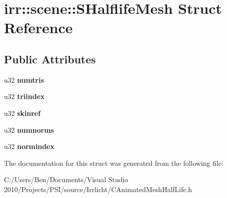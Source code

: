 \hypertarget{structirr_1_1scene_1_1_s_halflife_mesh}{\section{irr\-:\-:scene\-:\-:S\-Halflife\-Mesh Struct Reference}
\label{structirr_1_1scene_1_1_s_halflife_mesh}
}
\subsection*{Public Attributes}
\begin{DoxyCompactItemize}
\item 
\hypertarget{structirr_1_1scene_1_1_s_halflife_mesh_a77867441a6f7d9fdb33e2d89a884f502}{u32 {\bfseries numtris}}\label{structirr_1_1scene_1_1_s_halflife_mesh_a77867441a6f7d9fdb33e2d89a884f502}

\item 
\hypertarget{structirr_1_1scene_1_1_s_halflife_mesh_ae626e232e9d1d8ef21c98ea98a2300cb}{u32 {\bfseries triindex}}\label{structirr_1_1scene_1_1_s_halflife_mesh_ae626e232e9d1d8ef21c98ea98a2300cb}

\item 
\hypertarget{structirr_1_1scene_1_1_s_halflife_mesh_a2f12e23f6a640b9f26ca575eb969d16e}{u32 {\bfseries skinref}}\label{structirr_1_1scene_1_1_s_halflife_mesh_a2f12e23f6a640b9f26ca575eb969d16e}

\item 
\hypertarget{structirr_1_1scene_1_1_s_halflife_mesh_a8ac98deed1e5a5ebcdc87e05df5a6b4b}{u32 {\bfseries numnorms}}\label{structirr_1_1scene_1_1_s_halflife_mesh_a8ac98deed1e5a5ebcdc87e05df5a6b4b}

\item 
\hypertarget{structirr_1_1scene_1_1_s_halflife_mesh_a62bb383e98663028c3cc23fc3b2cba82}{u32 {\bfseries normindex}}\label{structirr_1_1scene_1_1_s_halflife_mesh_a62bb383e98663028c3cc23fc3b2cba82}

\end{DoxyCompactItemize}


The documentation for this struct was generated from the following file\-:\begin{DoxyCompactItemize}
\item 
C\-:/\-Users/\-Ben/\-Documents/\-Visual Studio 2010/\-Projects/\-P\-S\-I/source/\-Irrlicht/C\-Animated\-Mesh\-Half\-Life.\-h\end{DoxyCompactItemize}
